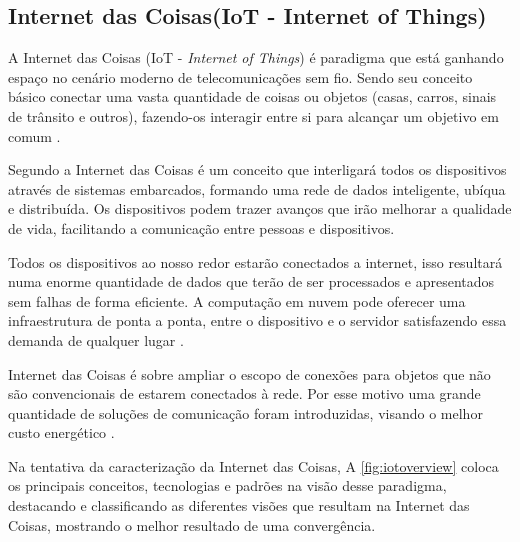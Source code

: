 \subsection{Internet das Coisas(IoT - Internet of Things)}

A Internet das Coisas (IoT - \textit{Internet of Things}) é paradigma que está ganhando espaço no cenário moderno de telecomunicações sem fio. Sendo seu conceito básico conectar uma vasta quantidade de coisas ou objetos (casas, carros, sinais de trânsito e outros), fazendo-os interagir entre si para alcançar um objetivo em comum \cite{atzori2010internet}.


Segundo \cite{xia:2012} a Internet das Coisas é um conceito que interligará todos os dispositivos através de sistemas embarcados, formando uma rede de dados inteligente, ubíqua e distribuída. Os dispositivos podem trazer avanços que irão melhorar a qualidade de vida, facilitando a comunicação entre pessoas e dispositivos.

Todos os dispositivos ao nosso redor estarão conectados a internet, isso resultará numa enorme quantidade de dados que terão de ser processados e apresentados sem falhas de forma eficiente. A computação em nuvem pode oferecer uma infraestrutura de ponta a ponta, entre o dispositivo e o servidor satisfazendo essa demanda de qualquer lugar \cite{Gubbi:2013}.

Internet das Coisas é sobre ampliar o escopo de conexões para objetos que não são convencionais de estarem conectados à rede. Por esse motivo uma grande quantidade de soluções de comunicação foram introduzidas, visando o melhor custo energético \cite{siekkinen2012low}. 

Na tentativa da caracterização da Internet das Coisas, A \autoref{fig:iotoverview} coloca os principais conceitos, tecnologias e padrões na visão desse paradigma, destacando e classificando as diferentes visões que resultam na Internet das Coisas, mostrando o melhor resultado de uma convergência.

